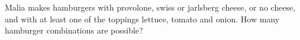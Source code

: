 Malia makes hamburgers with provolone, swiss or jarlsberg cheese, or no cheese, and with at least one of the toppings lettuce, tomato and onion. How many hamburger combinations are possible?
